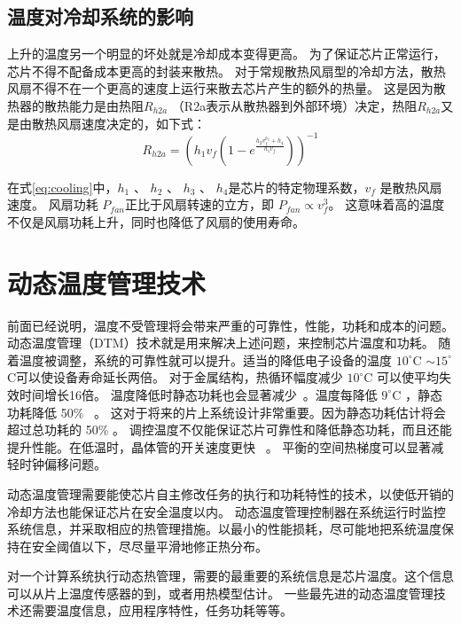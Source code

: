 \subsection{温度对冷却系统的影响}\label{sec:cooling}

上升的温度另一个明显的坏处就是冷却成本变得更高。
为了保证芯片正常运行，芯片不得不配备成本更高的封装来散热。
对于常规散热风扇型的冷却方法，散热风扇不得不在一个更高的速度上运行来散去芯片产生的额外的热量。
这是因为散热器的散热能力是由热阻$R_{h2a}$ （R2a表示从散热器到外部环境）决定，热阻$R_{h2a}$又是由散热风扇速度决定的，如下式：
\begin{equation}\label{eq:cooling}
R_{h2a} = (h_1v_f(1-e^{\frac{h_2v_f^{h_3}+h_4}{h_1v_f}}))^{-1}
\end{equation}

在式\eqref{eq:cooling}中，$h_1$ 、 $h_2$ 、 $h_3$ 、 $h_4$是芯片的特定物理系数，$v_f$ 是散热风扇速度。
风扇功耗 $P_{fan}$正比于风扇转速的立方，即 $P_{fan} \propto v_f^3$。
这意味着高的温度不仅是风扇功耗上升，同时也降低了风扇的使用寿命。

\section{动态温度管理技术}\label{sec:DTM}

前面已经说明，温度不受管理将会带来严重的可靠性，性能，功耗和成本的问题。
动态温度管理（DTM）技术就是用来解决上述问题，来控制芯片温度和功耗。
随着温度被调整，系统的可靠性就可以提升。适当的降低电子设备的温度 $10^{\circ}$C $\sim 15^{\circ}$C可以使设备寿命延长两倍。
对于金属结构，热循环幅度减少 $10^{\circ}$C 可以使平均失效时间增长16倍。
温度降低时静态功耗也会显著减少~\cite{kursun2006investigating}。温度每降低 $9^{\circ}$C ，静态功耗降低 50\%~\cite{liu2007accurate} 。
这对于将来的片上系统设计非常重要。因为静态功耗估计将会超过总功耗的 50\% 。
调控温度不仅能保证芯片可靠性和降低静态功耗，而且还能提升性能。在低温时，晶体管的开关速度更快~\cite{pamula2003cooling} 。
平衡的空间热梯度可以显著减轻时钟偏移问题。

动态温度管理需要能使芯片自主修改任务的执行和功耗特性的技术，以使低开销的冷却方法也能保证芯片在安全温度以内。
动态温度管理控制器在系统运行时监控系统信息，并采取相应的热管理措施。以最小的性能损耗，尽可能地把系统温度保持在安全阈值以下，尽尽量平滑地修正热分布。

对一个计算系统执行动态热管理，需要的最重要的系统信息是芯片温度。这个信息可以从片上温度传感器的到，或者用热模型估计。
一些最先进的动态温度管理技术还需要温度信息，应用程序特性，任务功耗等等。

